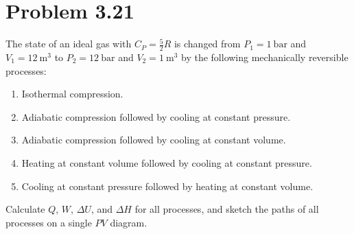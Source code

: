 \documentclass{article}
\begin{document}
\section*{Problem 3.21}
The state of an ideal gas with $C_P = \frac{5}{2}R$ is changed from
$P_1 = \SI{1}{\bar}$ and $V_1 = \SI{12}{\meter\cubed}$ to $P_2 =
\SI{12}{\bar}$ and $V_2 = \SI{1}{\meter\cubed}$ by the following
mechanically reversible processes:
\begin{enumerate}[label=(\alph*)]
  \item Isothermal compression.
  \item Adiabatic compression followed by cooling at constant pressure.
  \item Adiabatic compression followed by cooling at constant volume.
  \item Heating at constant volume followed by cooling at constant pressure.
  \item Cooling at constant pressure followed by heating at constant volume.
\end{enumerate}
Calculate $Q$, $W$, $\Delta U$, and $\Delta H$ for all processes, and
sketch the paths of all processes on a single $PV$ diagram.
\end{document}
